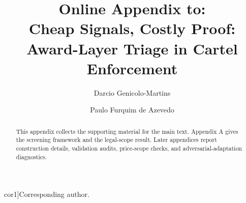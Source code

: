 \documentclass[12pt,authoryear]{elsarticle}
\def\corref#1{}%
\def\cortext#1{}%
\def\ead#1{}%
\begin{document}
\sloppy
\hfuzz=300pt

\begin{frontmatter}

\title{Online Appendix to:\\
Cheap Signals, Costly Proof:\\
Award-Layer Triage in Cartel Enforcement}

\author[insper]{Darcio Genicolo-Martins\corref{cor1}}
\ead{darciogm1@insper.edu.br}
\author[insper]{Paulo Furquim de Azevedo}
\cortext[cor1]{Corresponding author.}

\begin{abstract}
\noindent This appendix collects the supporting material for the
main text. Appendix A gives the screening framework and the
legal-scope result. Later appendices report construction details,
validation audits, price-scope checks, and adversarial-adaptation
diagnostics.
\end{abstract}

\end{frontmatter}

\appendix

\setcounter{table}{0}
\setcounter{figure}{0}
\renewcommand{\thetable}{\Alph{section}.\arabic{table}}
\renewcommand{\thefigure}{\Alph{section}.\arabic{figure}}
\makeatletter
{}
\makeatother










\end{document}
